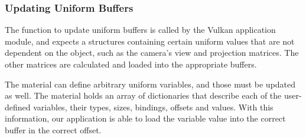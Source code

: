 \subsubsection{Updating Uniform Buffers}
The function to update uniform buffers is called by the Vulkan application module, and expects a structures containing certain uniform values that are not dependent on the object, such as the camera's view and projection matrices. The other matrices are calculated and loaded into the appropriate buffers.

The material can define arbitrary uniform variables, and those must be updated as well. The material holds an array of dictionaries that describe each of the user-defined variables, their types, sizes, bindings, offsets and values. With this information, our application is able to load the variable value into the correct buffer in the correct offset.
